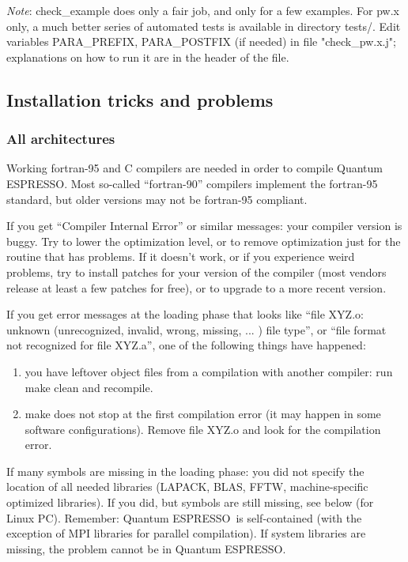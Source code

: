 \documentclass[12pt,a4paper]{article}
\def\qe{{\sc Quantum ESPRESSO}}
\begin{document}
{\em Note}: check\_example does only a fair job, and only for a few examples. 
For pw.x only, a much better series of automated tests is available in
directory tests/. Edit variables PARA\_PREFIX, PARA\_POSTFIX (if
needed) in file "check\_pw.x.j"; explanations on how to run it 
are in the header of the file.

\subsection{Installation tricks and problems}

\subsubsection{All architectures}

Working fortran-95 and C compilers are needed in order
to compile \qe. Most so-called ``fortran-90'' compilers
implement the fortran-95 standard, but older versions may not be
fortran-95 compliant.
    
If you get ``Compiler Internal Error'' or similar messages: your
compiler version is buggy. Try to lower the optimization level, or to
remove optimization just for the routine that has problems. If it
doesn't work, or if you experience weird problems, try to 
install patches for your version of the compiler (most vendors release
at least a few patches for free), or to upgrade to a more recent version.
    
If you get error messages at the loading phase that looks like 
``file XYZ.o: unknown (unrecognized, invalid, wrong, missing, ... ) file
type'', or  ``file format not recognized for file XYZ.a'', one of
the following things have happened:
\begin{enumerate}
\item you have leftover object files from a compilation with another
  compiler: run make clean and recompile. 
\item make does not stop at the first compilation error (it may happen
  in some software configurations). Remove file XYZ.o and look for the
  compilation  error. 
\end{enumerate}
If many symbols are missing in the loading phase: you did not specify the
location of all needed libraries (LAPACK, BLAS, FFTW, machine-specific
optimized libraries). If you did, but symbols are still missing, see below 
(for Linux PC). Remember: \qe\ is self-contained (with the exception of
MPI libraries for parallel compilation). If system libraries are missing, the
problem cannot be in \qe.
\end{document}
